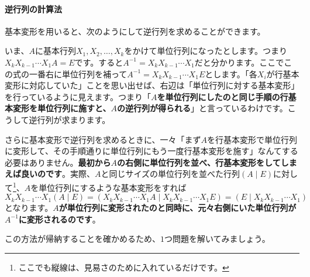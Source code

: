 \paragraph{逆行列の計算法}

基本変形を用いると、次のようにして逆行列を求めることができます。

いま、$A$に基本行列$X_1, X_2, \ldots, X_k$をかけて単位行列になったとします。つまり$X_k X_{k-1} \cdots X_1 A = E$です。すると$A^{-1} = X_k X_{k-1} \cdots X_1$だと分かります。ここでこの式の一番右に単位行列を補って$A^{-1} = X_k X_{k-1} \cdots X_1 E$とします。「各$X_i$が行基本変形に対応していた」ことを思い出せば、右辺は「単位行列に対する基本変形」を行っているように見えます。つまり「\textbf{$A$を単位行列にしたのと同じ手順の行基本変形を単位行列に施すと、$A$の逆行列が得られる}」と言っているわけです。こうして逆行列が求まります。

さらに基本変形で逆行列を求めるときに、一々「まず$A$を行基本変形で単位行列に変形して、その手順通りに単位行列にもう一度行基本変形を施す」なんてする必要はありません。\textbf{最初から$A$の右側に単位行列を並べ、行基本変形をしてしまえば良いのです}。実際、$A$と同じサイズの単位行列を並べた行列$(A \mid E)$に対して\footnote{ここでも縦線は、見易さのために入れているだけです。}、$A$を単位行列にするような基本変形をすれば
\[
X_k X_{k-1} \cdots X_1 (A \mid E) = (X_k X_{k-1} \cdots X_1 A \mid X_k X_{k-1} \cdots X_1 E) = (E \mid X_k X_{k-1} \cdots X_1)
\]
となります。\textbf{$A$が単位行列に変形されたのと同時に、元々右側にいた単位行列が$A^{-1}$に変形されるのです}。

この方法が帰納することを確かめるため、$1$つ問題を解いてみましょう。

